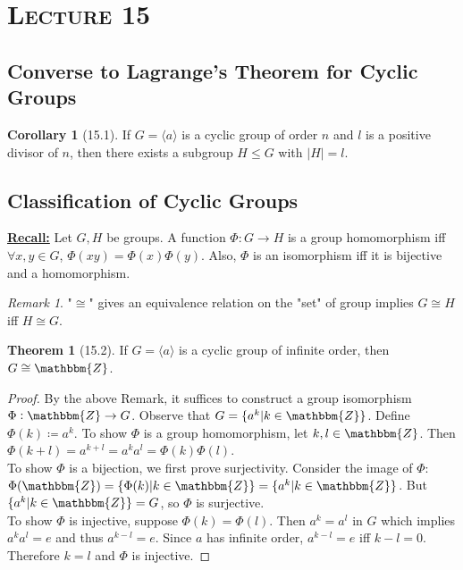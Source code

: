 \documentclass{article}
\newcommand{\Z}{\mathbbm{Z}}
\newcommand{\coleq}{\coloneqq}
\newcommand{\define}[1]{\textbf{\underline{#1}}}
\newcommand{\func}[3]{#1: #2 \to #3}
\theoremstyle{definition}
\newtheorem*{cor}{Corollary}
\newtheorem*{thm}{Theorem}
\theoremstyle{remark}
\newtheorem*{rmk}{Remark}
\newcommand{\cyc}[1]{\langle#1\rangle}
\newcommand{\iso}{\cong}
\begin{document}
    \section*{\textbf{\textsc{Lecture 15}}}{
        \subsection*{Converse to Lagrange's Theorem for Cyclic Groups}{
            \begin{cor}[15.1]
                If $G=\cyc{a}$ is a cyclic group of order $n$ and $l$ is a positive divisor of $n$, then there exists a subgroup $H\leq G$ with $|H|=l$.
            \end{cor}
        }
        \subsection*{Classification of Cyclic Groups}{
            \define{Recall:} Let $G,H$ be groups. A function $\func{\Phi}{G}{H}$ is a group homomorphism iff $\forall x,y \in G$, $\Phi(xy)=\Phi(x)\Phi(y)$. Also, $\Phi$ is an isomorphism iff it is bijective and a homomorphism.
            
            \begin{rmk}
                "$\iso$" gives an equivalence relation on the "set" of group implies $G\iso H$ iff $H \iso G$.
            \end{rmk}
            
            \begin{thm}[15.2]
                If $G=\cyc{a}$ is a cyclic group of infinite order, then $G \iso \Z$.
            \end{thm}
            
            \begin{proof}
                By the above Remark, it suffices to construct a group isomorphism $\func{\Phi}{\Z}{G}$. Observe that $G=\{a^k|k\in \Z\}$. Define $\Phi(k)\coleq a^k$. To show $\Phi$ is a group homomorphism, let $k,l \in \Z$. Then $\Phi(k+l)=a^{k+l}=a^ka^l=\Phi(k)\Phi(l)$.\\
                To show $\Phi$ is a bijection, we first prove surjectivity. Consider the image of $\Phi$: $\Phi(\Z)=\{\Phi(k)|k \in \Z\}=\{a^k|k \in \Z\}$. But $\{a^k|k \in \Z\}=G$, so $\Phi$ is surjective.\\
                To show $\Phi$ is injective, suppose $\Phi(k)=\Phi(l)$. Then $a^k=a^l$ in $G$ which implies $a^ka^l=e$ and thus $a^{k-l}=e$. Since $a$ has infinite order, $a^{k-l}=e$ iff $k-l=0$. Therefore $k=l$ and $\Phi$ is injective.
            \end{proof}
            
}}
\end{document}
